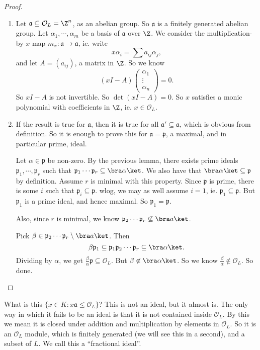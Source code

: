 \documentclass[a4paper]{article}
\begin{document}
\begin{proof}\leavevmode
  \begin{enumerate}
    \item Let $\mathfrak{a} \subseteq \mathcal{O}_L = \Z^n$, as an abelian group. So $\mathfrak{a}$ is a finitely generated abelian group. Let $\alpha_1, \cdots, \alpha_m$ be a basis of $\mathfrak{a}$ over $\Z$. We consider the multiplication-by-$x$ map $m_x: \mathfrak{a} \to \mathfrak{a}$, ie. write
      \[
        x\alpha_i = \sum a_{ij} \alpha_j,
      \]
      and let $A = (a_{ij})$, a matrix in $\Z$. So we know
      \[
        (xI - A)
        \begin{pmatrix}
          \alpha_1\\\vdots\\ \alpha_n
        \end{pmatrix}
        = 0.
      \]
      So $xI - A$ is not invertible. So $\det(xI - A) = 0$. So $x$ satisfies a monic polynomial with coefficients in $\Z$, ie. $x \in \mathcal{O}_L$.
    \item If the result is true for $\mathfrak{a}$, then it is true for all $\mathfrak{a}' \subseteq \mathfrak{a}$, which is obvious from definition. So it is enough to prove this for $\mathfrak{a} = \mathfrak{p}$, a maximal, and in particular prime, ideal.

      Let $\alpha \in \mathfrak{p}$ be non-zero. By the previous lemma, there exists prime ideals $\mathfrak{p}_1, \cdots, \mathfrak{p}_r$ such that $\mathfrak{p}_1 \cdots \mathfrak{p}_r \subseteq \bra \alpha\ket$. We also have that $\bra \alpha\ket \subseteq \mathfrak{p}$ by definition. Assume $r$ is minimal with this property. Since $\mathfrak{p}$ is prime, there is some $i$ such that $\mathfrak{p}_i \subseteq \mathfrak{p}$. wlog, we may as well assume $i = 1$, ie. $\mathfrak{p}_1 \subseteq \mathfrak{p}$. But $\mathfrak{p}_1$ is a prime ideal, and hence maximal. So $\mathfrak{p}_1 = \mathfrak{p}$.

      Also, since $r$ is minimal, we know $\mathfrak{p}_2 \cdots \mathfrak{p}_r \not\subseteq \bra a\ket$.

      Pick $\beta \in \mathfrak{p}_2 \cdots \mathfrak{p}_r \setminus \bra a\ket$. Then
      \[
        \beta \mathfrak{p}_1 \subseteq \mathfrak{p}_1 \mathfrak{p}_2 \cdots \mathfrak{p}_r \subseteq \bra \alpha\ket.
      \]
      Dividing by $\alpha$, we get $\frac{\beta}{\alpha}\mathfrak{p} \subseteq \mathcal{O}_L$. But $\beta \not\in \bra \alpha\ket$. So we know $\frac{\beta}{\alpha} \not\in \mathcal{O}_L$. So done.
  \end{enumerate}
\end{proof}
What is this $\{x \in K: x \mathfrak{a} \leq \mathcal{O}_L\}$? This is not an ideal, but it almost is. The only way in which it fails to be an ideal is that it is not contained inside $\mathcal{O}_L$. By this we mean it is closed under addition and multiplication by elements in $\mathcal{O}_L$. So it is an $\mathcal{O}_L$ module, which is finitely generated (we will see this in a second), and a subset of $L$. We call this a ``fractional ideal''.
\end{document}
